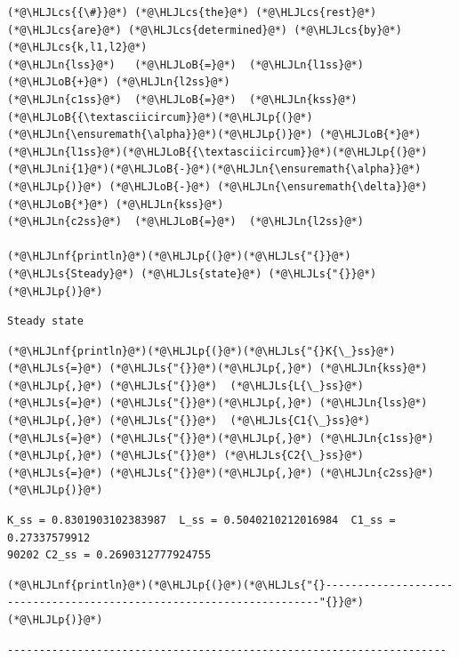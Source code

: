 \documentclass[12pt,a4paper]{article}
\newcommand{\HLJLn}[1]{#1}
\newcommand{\HLJLnf}[1]{\textcolor[RGB]{66,102,213}{#1}}
\newcommand{\HLJLs}[1]{\textcolor[RGB]{201,61,57}{#1}}
\newcommand{\HLJLni}[1]{\textcolor[RGB]{59,151,46}{#1}}
\newcommand{\HLJLoB}[1]{\textcolor[RGB]{102,102,102}{\textbf{#1}}}
\newcommand{\HLJLp}[1]{#1}
\newcommand{\HLJLcs}[1]{\textcolor[RGB]{153,153,119}{\textit{#1}}}
\begin{document}
\begin{lstlisting}
(*@\HLJLcs{{\#}}@*) (*@\HLJLcs{the}@*) (*@\HLJLcs{rest}@*) (*@\HLJLcs{are}@*) (*@\HLJLcs{determined}@*) (*@\HLJLcs{by}@*) (*@\HLJLcs{k,l1,l2}@*)
(*@\HLJLn{lss}@*)   (*@\HLJLoB{=}@*)  (*@\HLJLn{l1ss}@*) (*@\HLJLoB{+}@*) (*@\HLJLn{l2ss}@*)
(*@\HLJLn{c1ss}@*)  (*@\HLJLoB{=}@*)  (*@\HLJLn{kss}@*)(*@\HLJLoB{{\textasciicircum}}@*)(*@\HLJLp{(}@*)(*@\HLJLn{\ensuremath{\alpha}}@*)(*@\HLJLp{)}@*) (*@\HLJLoB{*}@*) (*@\HLJLn{l1ss}@*)(*@\HLJLoB{{\textasciicircum}}@*)(*@\HLJLp{(}@*)(*@\HLJLni{1}@*)(*@\HLJLoB{-}@*)(*@\HLJLn{\ensuremath{\alpha}}@*)(*@\HLJLp{)}@*) (*@\HLJLoB{-}@*) (*@\HLJLn{\ensuremath{\delta}}@*) (*@\HLJLoB{*}@*) (*@\HLJLn{kss}@*)
(*@\HLJLn{c2ss}@*)  (*@\HLJLoB{=}@*)  (*@\HLJLn{l2ss}@*)

(*@\HLJLnf{println}@*)(*@\HLJLp{(}@*)(*@\HLJLs{"{}}@*) (*@\HLJLs{Steady}@*) (*@\HLJLs{state}@*) (*@\HLJLs{"{}}@*)(*@\HLJLp{)}@*)
\end{lstlisting}

\begin{lstlisting}
Steady state
\end{lstlisting}


\begin{lstlisting}
(*@\HLJLnf{println}@*)(*@\HLJLp{(}@*)(*@\HLJLs{"{}K{\_}ss}@*) (*@\HLJLs{=}@*) (*@\HLJLs{"{}}@*)(*@\HLJLp{,}@*) (*@\HLJLn{kss}@*)(*@\HLJLp{,}@*) (*@\HLJLs{"{}}@*)  (*@\HLJLs{L{\_}ss}@*) (*@\HLJLs{=}@*) (*@\HLJLs{"{}}@*)(*@\HLJLp{,}@*) (*@\HLJLn{lss}@*)(*@\HLJLp{,}@*) (*@\HLJLs{"{}}@*)  (*@\HLJLs{C1{\_}ss}@*) (*@\HLJLs{=}@*) (*@\HLJLs{"{}}@*)(*@\HLJLp{,}@*) (*@\HLJLn{c1ss}@*)(*@\HLJLp{,}@*) (*@\HLJLs{"{}}@*) (*@\HLJLs{C2{\_}ss}@*) (*@\HLJLs{=}@*) (*@\HLJLs{"{}}@*)(*@\HLJLp{,}@*) (*@\HLJLn{c2ss}@*)(*@\HLJLp{)}@*)
\end{lstlisting}

\begin{lstlisting}
K_ss = 0.8301903102383987  L_ss = 0.5040210212016984  C1_ss = 0.27337579912
90202 C2_ss = 0.2690312777924755
\end{lstlisting}


\begin{lstlisting}
(*@\HLJLnf{println}@*)(*@\HLJLp{(}@*)(*@\HLJLs{"{}---------------------------------------------------------------------"{}}@*)(*@\HLJLp{)}@*)
\end{lstlisting}

\begin{lstlisting}
---------------------------------------------------------------------
\end{lstlisting}
\end{document}
